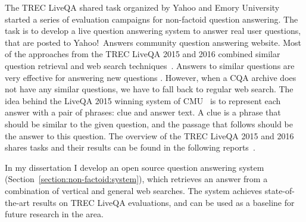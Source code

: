 The TREC LiveQA shared task organized by Yahoo and Emory University started a series of evaluation campaigns for non-factoid question answering.
The task is to develop a live question answering system to answer real user questions, that are posted to Yahoo!~Answers community question answering website.
Most of the approaches from the TREC LiveQA 2015 and 2016 combined similar question retrieval and web search techniques~\cite{savenkov_liveqa15,wang2015cmu,ecnucs_liveqa15}.
Answers to similar questions are very effective for answering new questions \cite{carmel2000eresponder,savenkov_liveqa15}.
However, when a CQA archive does not have any similar questions, we have to fall back to regular web search.
The idea behind the LiveQA 2015 winning system of CMU~\cite{wang2015cmu} is to represent each answer with a pair of phrases: clue and answer text.
A clue is a phrase that should be similar to the given question, and the passage that follows should be the answer to this question.
The overview of the TREC LiveQA 2015 and 2016 shares tasks and their results can be found in the following reports~\cite{overviewliveqa15,overviewliveqa16}.

In my dissertation I develop an open source question answering system (Section~\ref{section:non-factoid:system}), which retrieves an answer from a combination of vertical and general web searches.
The system achieves state-of-the-art results on TREC LiveQA evaluations, and can be used as a baseline for future research in the area.

